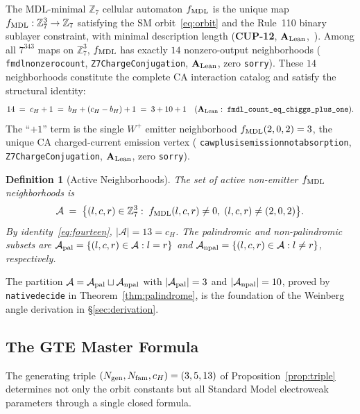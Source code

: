 \documentclass[11pt]{article}
\newtheorem{definition}[theorem]{Definition}
\theoremstyle{remark}
\newcommand{\Ngen}{N_{\rm gen}}
\newcommand{\Nfam}{N_{\rm fam}}
\newcommand{\bH}{b_H}
\newcommand{\cH}{c_H}
\newcommand{\lean}[1]{%
  \penalty-100
  \begingroup\def\_{\textunderscore\allowbreak}\texttt{#1}\endgroup}
\newcommand{\CatAL}{\ensuremath{\textbf{A}_{\rm Lean}}}
\begin{document}
The MDL-minimal $\mathbb{Z}_7$ cellular automaton $f_{\rm MDL}$ is the unique map
$f_{\rm MDL}: \mathbb{Z}_7^3 \to \mathbb{Z}_7$ satisfying the SM
orbit~\eqref{eq:orbit} and the Rule~110 binary sublayer constraint, with minimal
description length (\textbf{CUP-12}, $\CatAL$,~\cite{SpivackCompUniversality}).
Among all $7^{343}$ maps on $\mathbb{Z}_7^3$, $f_{\rm MDL}$ has exactly $14$
nonzero-output neighborhoods
(\lean{fmdl\_nonzero\_count\_14}, \texttt{Z7ChargeConjugation}, $\CatAL$,
zero \texttt{sorry}).
These $14$ neighborhoods constitute the complete CA interaction catalog and satisfy
the structural identity:
\begin{equation}
  14 \;=\; \cH + 1 \;=\; \bH + (\cH - \bH) + 1 \;=\; 3 + 10 + 1
  \quad(\CatAL:\;\lean{fmdl\_count\_eq\_chiggs\_plus\_one}).
\label{eq:fourteen}
\end{equation}
The ``$+1$'' term is the single $W^+$ emitter neighborhood $f_{\rm MDL}(2,0,2) = 3$,
the unique CA charged-current emission vertex
(\lean{ca\_w\_plus\_is\_emission\allowbreak\_not\_absorption}, \texttt{Z7ChargeConjugation}, $\CatAL$,
zero \texttt{sorry}).

\begin{definition}[Active Neighborhoods]
\label{def:active}
The set of \emph{active non-emitter} $f_{\rm MDL}$ neighborhoods is
\[
  \mathcal{A} \;=\;
  \bigl\{(l,c,r) \in \mathbb{Z}_7^3 :\;
  f_{\rm MDL}(l,c,r) \neq 0,\;
  (l,c,r) \neq (2,0,2)\bigr\}.
\]
By identity~\eqref{eq:fourteen}, $|\mathcal{A}| = 13 = \cH$.
The \emph{palindromic} and \emph{non-palindromic} subsets are
$\mathcal{A}_{\rm pal} = \{(l,c,r) \in \mathcal{A} : l = r\}$ and
$\mathcal{A}_{\rm npal} = \{(l,c,r) \in \mathcal{A} : l \neq r\}$,
respectively.
\end{definition}

The partition $\mathcal{A} = \mathcal{A}_{\rm pal} \sqcup \mathcal{A}_{\rm npal}$
with $|\mathcal{A}_{\rm pal}| = 3$ and $|\mathcal{A}_{\rm npal}| = 10$, proved by
\lean{native\_decide} in Theorem~\ref{thm:palindrome}, is the foundation of the
Weinberg angle derivation in \S\ref{sec:derivation}.

\subsection{The GTE Master Formula}
\label{sec:prelim_master}

The generating triple $(\Ngen, \Nfam, \cH) = (3, 5, 13)$ of
Proposition~\ref{prop:triple} determines not only the orbit constants but all
Standard Model electroweak parameters through a single closed formula.
\end{document}
